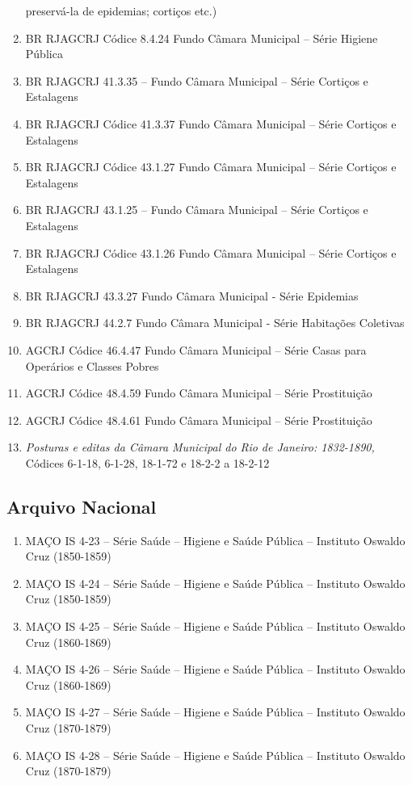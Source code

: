 \begin{enumerate}
  preservá-la de epidemias; cortiços etc.)
\item
  BR RJAGCRJ Códice 8.4.24 Fundo Câmara Municipal -- Série Higiene
  Pública
\item
  BR RJAGCRJ 41.3.35 -- Fundo Câmara Municipal -- Série Cortiços e
  Estalagens
\item
  BR RJAGCRJ Códice 41.3.37 Fundo Câmara Municipal -- Série Cortiços e
  Estalagens
\item
  BR RJAGCRJ Códice 43.1.27 Fundo Câmara Municipal -- Série Cortiços e
  Estalagens
\item
  BR RJAGCRJ 43.1.25 -- Fundo Câmara Municipal -- Série Cortiços e
  Estalagens
\item
  BR RJAGCRJ Códice 43.1.26 Fundo Câmara Municipal -- Série Cortiços e
  Estalagens
\item
  BR RJAGCRJ 43.3.27 Fundo Câmara Municipal - Série Epidemias
\item
  BR RJAGCRJ 44.2.7 Fundo Câmara Municipal - Série Habitações Coletivas
\item
  AGCRJ Códice 46.4.47 Fundo Câmara Municipal -- Série Casas para
  Operários e Classes Pobres
\item
  AGCRJ Códice 48.4.59 Fundo Câmara Municipal -- Série Prostituição
\item
  AGCRJ Códice 48.4.61 Fundo Câmara Municipal -- Série Prostituição
\item
  \emph{Posturas e editas da Câmara Municipal do Rio de Janeiro:
  1832-1890,} Códices 6-1-18, 6-1-28, 18-1-72 e 18-2-2 a 18-2-12
\end{enumerate}

\subsection*{Arquivo Nacional}\label{arquivo-nacional}

\begin{enumerate}
\def\labelenumi{\arabic{enumi}.}
\item
  MAÇO IS 4-23 -- Série Saúde -- Higiene e Saúde Pública -- Instituto
  Oswaldo Cruz (1850-1859)
\item
  MAÇO IS 4-24 -- Série Saúde -- Higiene e Saúde Pública -- Instituto
  Oswaldo Cruz (1850-1859)
\item
  MAÇO IS 4-25 -- Série Saúde -- Higiene e Saúde Pública -- Instituto
  Oswaldo Cruz (1860-1869)
\item
  MAÇO IS 4-26 -- Série Saúde -- Higiene e Saúde Pública -- Instituto
  Oswaldo Cruz (1860-1869)
\item
  MAÇO IS 4-27 -- Série Saúde -- Higiene e Saúde Pública -- Instituto
  Oswaldo Cruz (1870-1879)
\item
  MAÇO IS 4-28 -- Série Saúde -- Higiene e Saúde Pública -- Instituto
  Oswaldo Cruz (1870-1879)
\end{enumerate}

